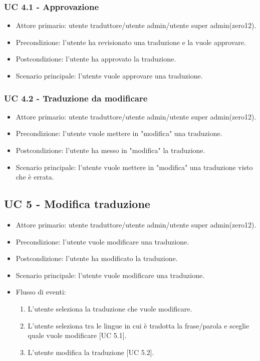     \subsubsection{UC 4.1 - Approvazione}
        \begin{itemize}
            \item Attore primario: utente traduttore/utente admin/utente super admin(zero12).
            \item Precondizione: l'utente ha revisionato una traduzione e la vuole approvare.
            \item Postcondizione: l'utente ha approvato la traduzione.
            \item Scenario principale: l'utente vuole approvare una traduzione.
        \end{itemize}
    \subsubsection{UC 4.2 - Traduzione da modificare}
        \begin{itemize}
            \item Attore primario: utente traduttore/utente admin/utente super admin(zero12).
            \item Precondizione: l'utente vuole mettere in "modifica" una traduzione.
            \item Postcondizione: l'utente ha messo in "modifica" la traduzione.
            \item Scenario principale: l'utente vuole mettere in "modifica" una traduzione visto che è errata.
        \end{itemize}
\subsection{UC 5 - Modifica traduzione}
    \begin{itemize}
        \item Attore primario: utente traduttore/utente admin/utente super admin(zero12).
        \item Precondizione: l'utente vuole modificare una traduzione.
        \item Postcondizione: l'utente ha modificato la traduzione.
        \item Scenario principale: l'utente vuole modificare una traduzione.
        \item Flusso di eventi:
            \begin{enumerate}
                \item L'utente seleziona la traduzione che vuole modificare.
                \item L'utente seleziona tra le lingue in cui è tradotta la frase/parola e sceglie quale vuole modificare [UC 5.1].
                \item L'utente modifica la traduzione [UC 5.2].
            \end{enumerate}
    \end{itemize}
